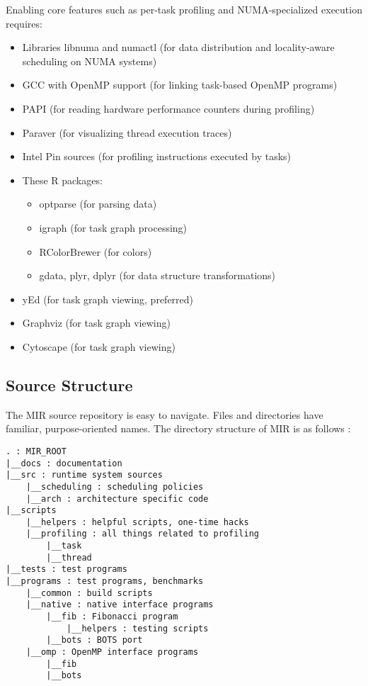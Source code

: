 \documentclass[11pt,a4paper]{article}
\begin{document}
Enabling core features such as per-task profiling and NUMA-specialized execution requires:

\begin{itemize}
\item Libraries libnuma and numactl (for data distribution and locality-aware scheduling on NUMA systems)
\item GCC with OpenMP support (for linking task-based OpenMP programs)
\item PAPI (for reading hardware performance counters during profiling)
\item Paraver (for visualizing thread execution traces)
\item Intel Pin sources (for profiling instructions executed by tasks)
\item These R packages:
  \begin{itemize}
  \item optparse (for parsing data)
  \item igraph (for task graph processing)
  \item RColorBrewer (for colors)
  \item gdata, plyr, dplyr (for data structure transformations)
  \end{itemize}
\item yEd (for task graph viewing, preferred)
\item Graphviz (for task graph viewing)
\item Cytoscape (for task graph viewing)
\end{itemize}

\subsection{Source Structure}\label{source-structure}

The MIR source repository is easy to navigate. Files and directories have familiar, purpose-oriented names. The directory structure of MIR is as follows :

\begin{lstlisting}[style=MyInputStyle]
. : MIR_ROOT
|__docs : documentation
|__src : runtime system sources
    |__scheduling : scheduling policies
    |__arch : architecture specific code
|__scripts
    |__helpers : helpful scripts, one-time hacks
    |__profiling : all things related to profiling
        |__task
        |__thread
|__tests : test programs
|__programs : test programs, benchmarks
    |__common : build scripts
    |__native : native interface programs
        |__fib : Fibonacci program
            |__helpers : testing scripts
        |__bots : BOTS port
    |__omp : OpenMP interface programs
        |__fib
        |__bots
\end{lstlisting}
\end{document}
